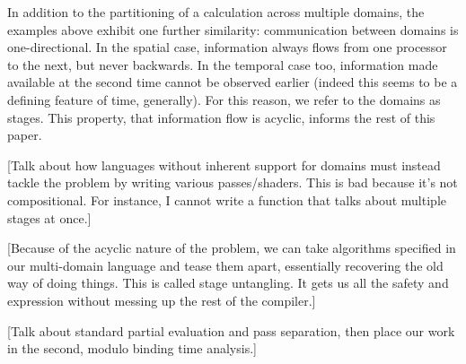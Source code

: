 \documentclass{article}
\begin{document}
In addition to the partitioning of a calculation across multiple domains, the examples above exhibit one further similarity: communication between domains is one-directional.  In the spatial case, information always flows from one processor to the next, but never backwards.  In the temporal case too, information made available at the second time cannot be observed earlier (indeed this seems to be a defining feature of time, generally).  For this reason, we refer to the domains as stages.  This property, that information flow is acyclic, informs the rest of this paper.

[Talk about how languages without inherent support for domains must instead tackle the problem by writing various passes/shaders. This is bad because it's not compositional.  For instance, I cannot write a function that talks about multiple stages at once.]

[Because of the acyclic nature of the problem, we can take algorithms specified in our multi-domain language and tease them apart, essentially recovering the old way of doing things.  This is called stage untangling.  It gets us all the safety and expression without messing up the rest of the compiler.]

[Talk about standard partial evaluation and pass separation, then place our work in the second, modulo binding time analysis.]
\end{document}
